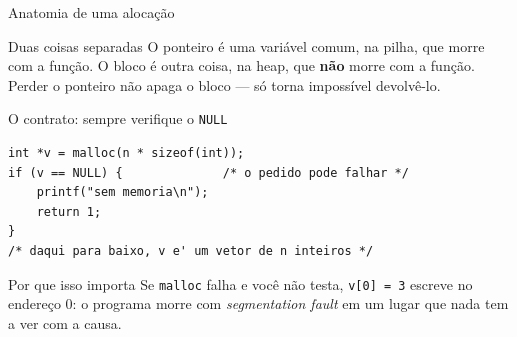 \documentclass[aspectratio=169]{beamer}
\begin{document}
\begin{frame}{Anatomia de uma alocação}
  \begin{center}
  \end{center}
  \begin{block}{Duas coisas separadas}
    O ponteiro é uma variável comum, na pilha, que morre com a função.
    O bloco é outra coisa, na heap, que \textbf{não} morre com a função.
    Perder o ponteiro não apaga o bloco --- só torna impossível devolvê-lo.
  \end{block}
\end{frame}

\begin{frame}[fragile]{O contrato: sempre verifique o \texttt{NULL}}
\begin{lstlisting}[basicstyle=\ttfamily\scriptsize]
int *v = malloc(n * sizeof(int));
if (v == NULL) {              /* o pedido pode falhar */
    printf("sem memoria\n");
    return 1;
}
/* daqui para baixo, v e' um vetor de n inteiros */
\end{lstlisting}
  \begin{alertblock}{Por que isso importa}
    Se \texttt{malloc} falha e você não testa, \texttt{v[0] = 3} escreve no
    endereço 0: o programa morre com \emph{segmentation fault} em um lugar que
    nada tem a ver com a causa.
  \end{alertblock}
\end{frame}
\end{document}
